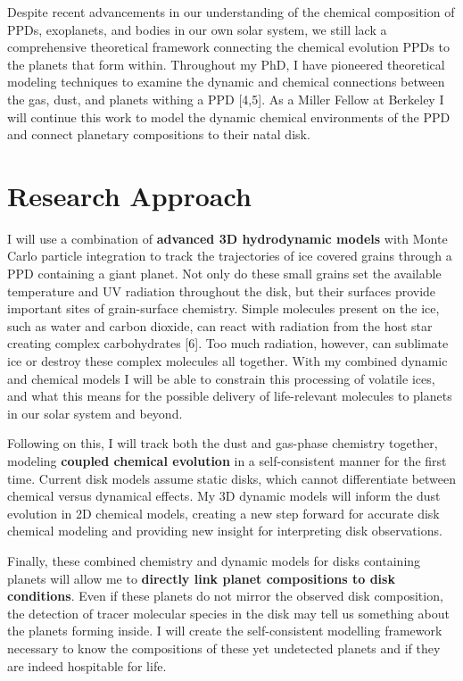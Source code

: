 \documentclass[11pt]{article}
\let\Oldsection\section
\renewcommand{\section}{\FloatBarrier\Oldsection}
\begin{document}
Despite recent advancements in our understanding of the chemical
composition of PPDs, exoplanets, and bodies in our own solar system, we
still lack a comprehensive theoretical framework connecting the chemical
evolution PPDs to the planets that form within. Throughout my PhD, I
have pioneered theoretical modeling techniques to examine the dynamic
and chemical connections between the gas, dust, and planets withing a
PPD {[}4,5{]}. As a Miller Fellow at Berkeley I will continue this work
to model the dynamic chemical environments of the PPD and connect
planetary compositions to their natal disk.

\hypertarget{research-approach}{%
\section{Research Approach}\label{research-approach}}

I will use a combination of \textbf{advanced 3D hydrodynamic models}
with Monte Carlo particle integration to track the trajectories of ice
covered grains through a PPD containing a giant planet. Not only do
these small grains set the available temperature and UV radiation
throughout the disk, but their surfaces provide important sites of
grain-surface chemistry. Simple molecules present on the ice, such as
water and carbon dioxide, can react with radiation from the host star
creating complex carbohydrates {[}6{]}. Too much radiation, however, can
sublimate ice or destroy these complex molecules all together. With my
combined dynamic and chemical models I will be able to constrain this
processing of volatile ices, and what this means for the possible
delivery of life-relevant molecules to planets in our solar system and
beyond.

Following on this, I will track both the dust and gas-phase chemistry
together, modeling \textbf{coupled chemical evolution} in a
self-consistent manner for the first time. Current disk models assume
static disks, which cannot differentiate between chemical versus
dynamical effects. My 3D dynamic models will inform the dust evolution
in 2D chemical models, creating a new step forward for accurate disk
chemical modeling and providing new insight for interpreting disk
observations.

Finally, these combined chemistry and dynamic models for disks
containing planets will allow me to \textbf{directly link planet
compositions to disk conditions}. Even if these planets do not mirror
the observed disk composition, the detection of tracer molecular species
in the disk may tell us something about the planets forming inside. I
will create the self-consistent modelling framework necessary to know
the compositions of these yet undetected planets and if they are indeed
hospitable for life.
\end{document}

